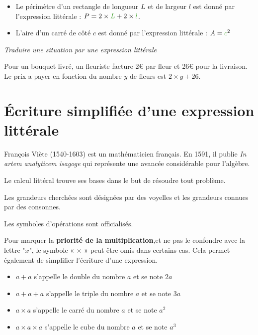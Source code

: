 \documentclass[a4paper,dvipsnames]{article}
\begin{document}
\begin{Ex}
\begin{itemize}
\item Le périmètre d'un rectangle de longueur \textcolor{sacado_green}{$L$} et de largeur \textcolor{sacado_green}{$l$} est donné par l'expression littérale : $P=2\times\textcolor{sacado_green}{L}+2\times\textcolor{sacado_green}{l}$.
\item L'aire d'un carré de côté \textcolor{sacado_green}{$c$} est donné par l'expression littérale : $A=\textcolor{sacado_green}{c}^2$
\end{itemize}
\end{Ex}

\begin{Mt}
\textit{Traduire une situation par une expression littérale}

Pour un bouquet livré, un fleuriste facture 2€ par fleur et 26€ pour la livraison. Le prix a payer en fonction du nombre $y$ de fleurs est $2\times y+26$.
\end{Mt}

\section{Écriture simplifiée d'une expression littérale}

\begin{His}
François Viète (1540-1603) est un mathématicien français. En 1591, il publie \textit{In artem analyticem isagoge} qui représente une avancée considérable pour l'algèbre.

Le calcul littéral trouve ses bases dans le but de résoudre tout problème.

Les grandeurs cherchées sont désignées par des voyelles et les grandeurs connues par des consonnes.

Les symboles d'opérations sont officialisés.
\end{His}

\begin{Pp}
Pour marquer la \textbf{priorité de la multiplication},et ne pas le confondre avec la lettre "$x$",  le symbole « $\times$ » peut être omis dans certains cas. Cela permet également de simplifier l'écriture d'une expression.
\end{Pp}

\begin{Def}
\begin{itemize}
\item $a+a$ s'appelle le double du nombre $a$ et se note $2a$
\item $a+a+a$ s'appelle le triple du nombre $a$ et se note $3a$
\item $a\times a$ s'appelle le carré du nombre $a$ et se note $a^2$
\item $a\times a\times a$ s'appelle le cube du nombre $a$ et se note $a^3$
\end{itemize}
\end{Def}
\end{document}
